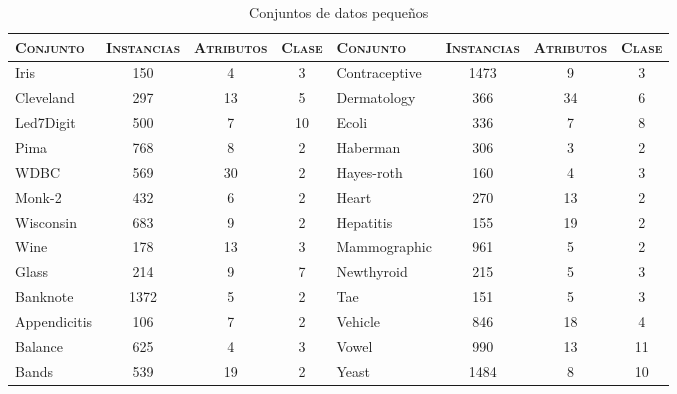 \newpage

\begin{table}[]
\centering
\begin{adjustbox}{max width =\textwidth}
\begin{tabular}{l c c c|l c c c}
\hline
\textsc{Conjunto} & \textsc{Instancias} & \textsc{Atributos} & \textsc{Clase} & \textsc{Conjunto} & \textsc{Instancias} & \textsc{Atributos} & \textsc{Clase} \\
\hline
\hline

Iris          & 150  &  4 &  3 & Contraceptive & 1473 & 9  &  3 \\
Cleveland     & 297  & 13 &  5 & Dermatology   &  366 & 34 &  6 \\
Led7Digit     & 500  &  7 & 10 & Ecoli         &  336 &  7 &  8 \\
Pima          & 768  &  8 &  2 & Haberman      &  306 & 3  &  2 \\
WDBC          & 569  & 30 &  2 & Hayes-roth    &  160 & 4  &  3 \\
Monk-2        & 432  &  6 &  2 & Heart         &  270 & 13 &  2 \\
Wisconsin     & 683  &  9 &  2 & Hepatitis     &  155 & 19 &  2 \\
Wine          & 178  & 13 &  3 & Mammographic  &  961 & 5  &  2 \\
Glass         & 214  &  9 &  7 & Newthyroid    &  215 & 5  &  3 \\
Banknote      & 1372 &  5 &  2 & Tae           &  151 & 5  &  3 \\
Appendicitis  & 106  &  7 &  2 & Vehicle       &  846 & 18 &  4 \\
Balance       & 625  &  4 &  3 & Vowel         &  990 & 13 & 11 \\
Bands         & 539  & 19 &  2 & Yeast         & 1484 & 8  & 10 \\


 
\hline
\end{tabular}
\end{adjustbox}
\caption{Conjuntos de datos pequeños}
\label{pequenios}
\end{table}


